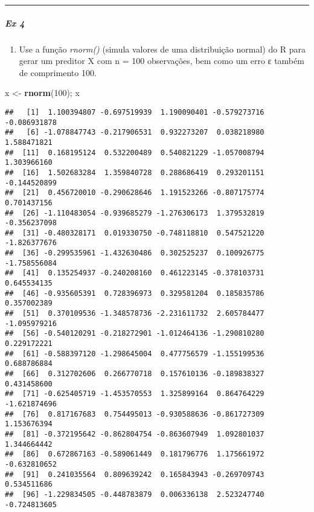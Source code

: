 \documentclass[]{article}
\newenvironment{Shaded}{\begin{snugshade}}{\end{snugshade}}
\newcommand{\DecValTok}[1]{\textcolor[rgb]{0.00,0.00,0.81}{#1}}
\newcommand{\KeywordTok}[1]{\textcolor[rgb]{0.13,0.29,0.53}{\textbf{#1}}}
\newcommand{\NormalTok}[1]{#1}
\newcommand{\StringTok}[1]{\textcolor[rgb]{0.31,0.60,0.02}{#1}}
\providecommand{\tightlist}{%
  \setlength{\itemsep}{0pt}\setlength{\parskip}{0pt}}
\let\oldsubparagraph\subparagraph
\renewcommand{\subparagraph}[1]{\oldsubparagraph{#1}\mbox{}}
\begin{document}
\begin{center}\rule{0.5\linewidth}{0.5pt}\end{center}

\hypertarget{ex-4}{%
\subparagraph{Ex 4}\label{ex-4}}

\begin{enumerate}
\def\labelenumi{(\alph{enumi})}
\tightlist
\item
  Use a função \emph{rnorm()} (simula valores de uma distribuição
  normal) do R para gerar um preditor X com n = 100 observações, bem
  como um erro ε também de comprimento 100.
\end{enumerate}

\begin{Shaded}
\begin{Highlighting}[]
\NormalTok{x <-}\StringTok{ }\KeywordTok{rnorm}\NormalTok{(}\DecValTok{100}\NormalTok{); x}
\end{Highlighting}
\end{Shaded}

\begin{verbatim}
##   [1]  1.100394807 -0.697519939  1.190090401 -0.579273716 -0.086931878
##   [6] -1.078847743 -0.217906531  0.932273207  0.038218980  1.588471821
##  [11]  0.168195124  0.532200489  0.540821229 -1.057008794  1.303966160
##  [16]  1.502683284  1.359840728  0.288686419  0.293201151 -0.144520899
##  [21]  0.456720010 -0.290628646  1.191523266 -0.807175774  0.701437156
##  [26] -1.110483054 -0.939685279 -1.276306173  1.379532819 -0.356237098
##  [31] -0.480328171  0.019330750 -0.748118810  0.547521220 -1.826377676
##  [36] -0.299535961 -1.432630486  0.302525237  0.100926775 -1.758556084
##  [41]  0.135254937 -0.240208160  0.461223145 -0.378103731  0.645534135
##  [46] -0.935605391  0.728396973  0.329581204  0.185835786  0.357002389
##  [51]  0.370109536 -1.348578736 -2.231611732  2.605784477 -1.095979216
##  [56] -0.540120291 -0.218272901 -1.012464136 -1.290810280  0.229172221
##  [61] -0.588397120 -1.298645004  0.477756579 -1.155199536  0.688786884
##  [66]  0.312702606  0.266770718  0.157610136 -0.189838327  0.431458600
##  [71] -0.625405719 -1.453570553  1.325899164  0.864764229 -1.621874696
##  [76]  0.817167683  0.754495013 -0.930588636 -0.861727309  1.153676394
##  [81] -0.372195642 -0.862804754 -0.863607949  1.092801037  1.344664442
##  [86]  0.672867163 -0.589061449  0.181796776  1.175661972 -0.632810652
##  [91]  0.241035564  0.809639242  0.165843943 -0.269709743  0.534511686
##  [96] -1.229834505 -0.448783879  0.006336138  2.523247740 -0.724813605
\end{verbatim}
\end{document}
